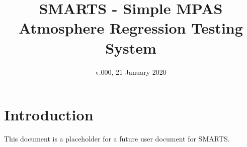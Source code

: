 \documentclass[11pt]{report}
\begin{document}
\title{SMARTS - Simple MPAS Atmosphere Regression Testing System}
\date{v.000, 21 January 2020}

\maketitle

\chapter{Introduction}
\label{chap:intro}

This document is a placeholder for a future user document for SMARTS.
\end{document}
